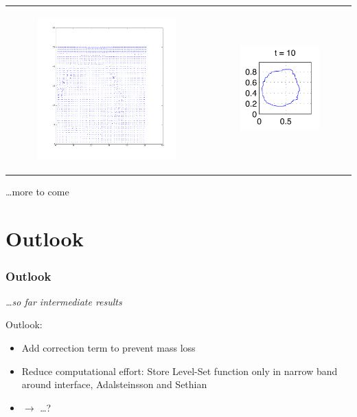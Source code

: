 \documentclass[ucs]{beamer}
\begin{document}
\begin{frame}
\begin{tabular}{l l}
\begin{minipage}{0.5\textwidth}
\begin{figure}[h!]
\includegraphics[width=7cm]{plots/vel10.png}
\end{figure}
\end{minipage}
&
\begin{minipage}{0.5\textwidth}
\begin{figure}[h!]
  \includegraphics[width=4cm]{plots/interface_t10.png}
\end{figure}
\end{minipage}
\end{tabular}
\dots more to come 
\end{frame}

\section{Outlook}
\begin{frame}
\frametitle{Outlook}
\textit{\dots so far intermediate results}

\vspace{.8cm} 
Outlook:
\begin{itemize}
\item<1-> Add correction term to prevent mass loss
\item<2-> Reduce computational effort: Store Level-Set function only in narrow band around interface, Adalsteinsson and Sethian
\item<3-> $\rightarrow$ \dots ?
\end{itemize}

\end{frame}
\end{document}
